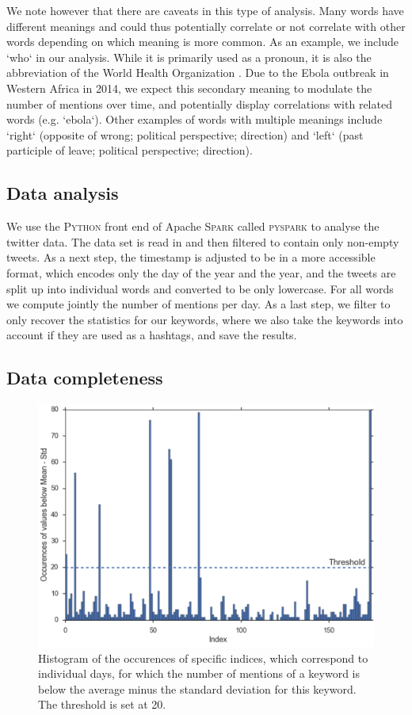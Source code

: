 \documentclass[12pt, a4paper]{article}
\begin{document}
We note however that there are caveats in this type of analysis. Many words have different meanings and could thus potentially correlate or not correlate with other words depending on which meaning is more common. As an example, we include `who` in our analysis. While it is primarily used as a pronoun, it is also the abbreviation of the World Health Organization \cite{who}. Due to the Ebola outbreak in Western Africa in 2014, we expect this secondary meaning to modulate the number of mentions over time, and potentially display correlations with related words (e.g. `ebola`). Other examples of words with multiple meanings include `right` (opposite of wrong; political perspective; direction) and `left` (past participle of leave; political perspective; direction).

\subsection{Data analysis}
We use the \textsc{Python} front end of Apache \textsc{Spark}\cite{pyspark} called \textsc{pyspark} to analyse the twitter data. The data set is read in and then filtered to contain only non-empty tweets. As a next step, the timestamp is adjusted to be in a more accessible format, which encodes only the day of the year and the year, and the tweets are split up into individual words and converted to be only lowercase. For all words we compute jointly the number of mentions per day. As a last step, we filter to only recover the statistics for our keywords, where we also take the keywords into account if they are used as a hashtags, and save the results.

\subsection{Data completeness}
\begin{figure}
\centering
\includegraphics[width=\linewidth]{figs/incomplete_data.pdf}
\caption{Histogram of the occurences of specific indices, which correspond to individual days, for which the number of mentions of a keyword is below the average minus the standard deviation for this keyword. The threshold is set at 20.}
\label{fig:incomplete}
\end{figure}
\end{document}
